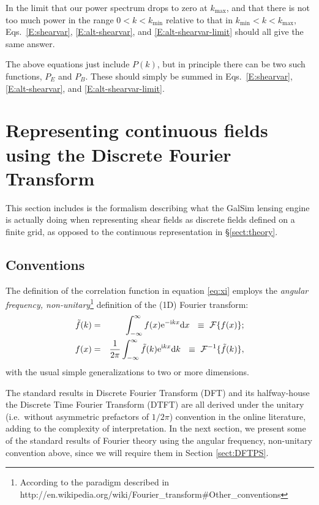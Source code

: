 \documentclass[preprint]{aastex}
\newcommand{\kmax}{\ensuremath{k_\mathrm{max}}}
\newcommand{\kmin}{\ensuremath{k_\mathrm{min}}}
\newcommand{\rmd}{\ensuremath{\mathrm{d}}}
\newcommand{\mi}{{\rm i}}
\newcommand{\me}{{\rm e}}
\begin{document}
In the limit that our power spectrum drops to zero at
\kmax, and that there is not too much power in the range $0<k<\kmin$
relative to that in $\kmin<k<\kmax$, Eqs.~\ref{E:shearvar}, \ref{E:alt-shearvar}, and
\ref{E:alt-shearvar-limit} should all give the same answer.

The above equations just include $P(k)$, but in principle there can be
two such functions, $P_{E}$ and $P_B$.  These should simply be summed
in Eqs.~\ref{E:shearvar}, \ref{E:alt-shearvar}, and
\ref{E:alt-shearvar-limit}.

\section{Representing continuous fields using the Discrete Fourier Transform}\label{S:discrete}

This section includes is the formalism describing what the GalSim
lensing engine is actually doing when representing shear fields as
discrete fields defined on a finite grid, as opposed to the continuous
representation in \S\ref{sect:theory}.

\subsection{Conventions}

The definition of the correlation function in equation \eqref{eq:xi}
employs the \emph{angular frequency, non-unitary}\footnote{According
  to the paradigm described in
  http://en.wikipedia.org/wiki/Fourier\_transform\#Other\_conventions}
definition of the (1D) Fourier transform:
\begin{eqnarray}
\tilde{f}(k) & = & \int_{-\infty}^{\infty} f(x) \me^{-\mi k x}
\rmd x ~ ~ \equiv ~ \mathcal{F} \{ f(x) \} \label{eq:fwdft} ; \\
f(x) & = & \frac{1}{2 \pi} \int_{-\infty}^{\infty} \tilde{f}(k) \me^{\mi k x}
\rmd k ~ ~ \equiv ~ \mathcal{F}^{-1}\{ \tilde{f}(k) \} \label{eq:invft}, 
\end{eqnarray}
with the usual simple generalizations to two or more dimensions.

The standard results in Discrete Fourier Transform (DFT) and its halfway-house the Discrete Time Fourier Transform (DTFT) are all derived under the unitary (i.e.\ without asymmetric prefactors of $1/2\pi$) convention in the online literature, adding to the complexity of interpretation.  In the next section, we present some of the standard results of Fourier theory using the angular frequency, non-unitary convention above, since we will require them in Section \ref{sect:DFTPS}.
\end{document}
